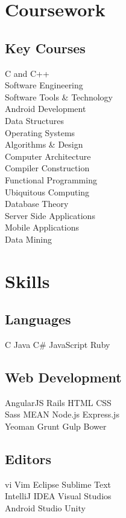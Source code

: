 \documentclass[]{deedy-resume-openfont}
\begin{document}
\begin{minipage}[t]{0.33\textwidth}
\section{Coursework}
\subsection{Key Courses}
C and C++ \\
Software Engineering \\
Software Tools \& Technology \\
Android Development \\
Data Structures \\
Operating Systems \\
Algorithms \& Design \\
Computer Architecture \\
Compiler Construction \\
Functional Programming \\
Ubiquitous Computing \\
Database Theory \\
Server Side Applications \\
Mobile Applications \\
Data Mining
\sectionsep


\section{Skills}
\subsection{Languages}
C \textbullet{} Java \textbullet{} C\# \textbullet{} JavaScript \textbullet{} Ruby \\ 
\subsection{Web Development}
AngularJS \textbullet{} Rails \textbullet{} HTML \textbullet{} CSS \\
Sass \textbullet{} MEAN \textbullet{}  Node.js \textbullet{} Express.js \\
Yeoman \textbullet{} Grunt \textbullet{} Gulp \textbullet{} Bower \\
\subsection{Editors}
vi \textbullet{} Vim \textbullet{} Eclipse \textbullet{} Sublime Text \\
IntelliJ IDEA \textbullet{} Visual Studios \\
Android Studio \textbullet{} Unity

\end{minipage}
\end{document}
